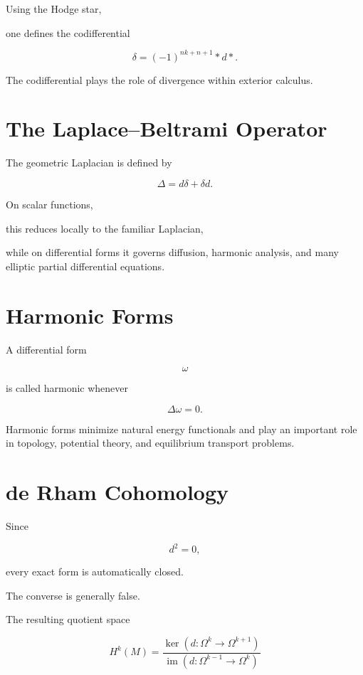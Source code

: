 \documentclass[11pt,fleqn]{book}
\numberwithin{equation}{chapter}
\theoremstyle{plain}
\theoremstyle{definition}
\theoremstyle{remark}
\begin{document}
Using the Hodge star,

one defines the codifferential

\[
\boxed{
\delta
=
(-1)^{nk+n+1}
*
d
*.
}
\]

The codifferential plays the role of divergence within exterior
calculus.


\section{The Laplace--Beltrami Operator}

The geometric Laplacian is defined by

\[
\boxed{
\Delta
=
d\delta
+
\delta d.
}
\]

On scalar functions,

this reduces locally to the familiar Laplacian,

while on differential forms it governs diffusion, harmonic analysis,
and many elliptic partial differential equations.


\section{Harmonic Forms}

A differential form

\[
\omega
\]

is called harmonic whenever

\[
\boxed{
\Delta\omega
=
0.
}
\]

Harmonic forms minimize natural energy functionals and play an important
role in topology, potential theory, and equilibrium transport problems.


\section{de Rham Cohomology}

Since

\[
d^2=0,
\]

every exact form is automatically closed.

The converse is generally false.

The resulting quotient space

\[
\boxed{
H^k(M)
=
\frac{\ker(d:\Omega^k\rightarrow\Omega^{k+1})}
{\operatorname{im}(d:\Omega^{k-1}\rightarrow\Omega^k)}
}
\]
\end{document}
